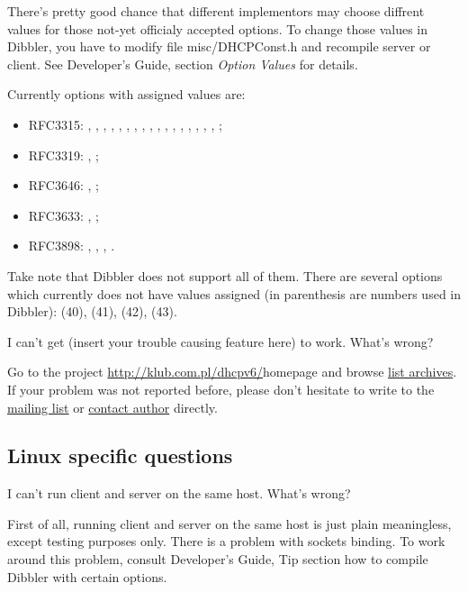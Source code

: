 There's pretty good chance that different implementors may choose
diffrent values for those not-yet officialy accepted options. To
change those values in Dibbler, you have to modify file
misc/DHCPConst.h and recompile server or client. See Developer's
Guide, section \emph{Option Values} for details.

Currently options with assigned values are: 
\begin{itemize}
\item RFC3315: ,
, , , ,
, , ,
, , , ,
, , ,
, , ;
\item RFC3319:
, ;
\item RFC3646: ,
;
\item RFC3633: , ;
\item RFC3898:
, , ,
. 

\end{itemize}
Take note that Dibbler does not support all of
them. There are several options which currently does not have values
assigned (in parenthesis are numbers used in Dibbler):
 (40),  (41),  (42),
 (43).

\Q I can't get (insert your trouble causing feature here) to
work. What's wrong? 

\A Go to the project \url{http://klub.com.pl/dhcpv6/}{homepage} and
browse \href{http://klub.com.pl/lists/dibbler/}{list archives}. If
your problem was not reported before, please don't hesitate to write
to the
\href{http://klub.com.pl/cgi-bin/mailman/listinfo/dibbler}{mailing
  list} or \href{mailto:thomson(at)klub.com.pl}{contact author}
directly. 

\subsection{Linux specific questions}

\Q I can't run client and server on the same host. What's wrong?

\A First of all, running client and server on the same host is just
plain meaningless, except testing purposes only. There is a problem
with sockets binding. To work around this problem, consult Developer's
Guide, Tip section how to compile Dibbler with certain options.

